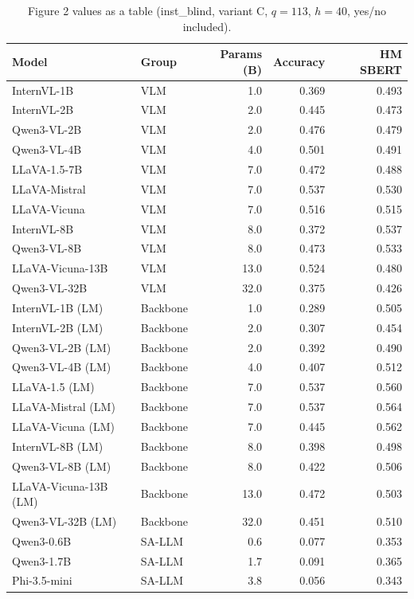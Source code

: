 \begin{table}[t]
\centering
\caption{Figure 2 values as a table (inst\_blind, variant C, $q=113$, $h=40$, yes/no included).}
\label{tab:fig2_scale_table}
\scriptsize
\setlength{\tabcolsep}{4pt}
\begin{tabular}{llrrr}
\toprule
Model & Group & Params (B) & Accuracy & HM SBERT \\
\midrule
InternVL-1B & VLM & 1.0 & 0.369 & 0.493 \\
InternVL-2B & VLM & 2.0 & 0.445 & 0.473 \\
Qwen3-VL-2B & VLM & 2.0 & 0.476 & 0.479 \\
Qwen3-VL-4B & VLM & 4.0 & 0.501 & 0.491 \\
LLaVA-1.5-7B & VLM & 7.0 & 0.472 & 0.488 \\
LLaVA-Mistral & VLM & 7.0 & 0.537 & 0.530 \\
LLaVA-Vicuna & VLM & 7.0 & 0.516 & 0.515 \\
InternVL-8B & VLM & 8.0 & 0.372 & 0.537 \\
Qwen3-VL-8B & VLM & 8.0 & 0.473 & 0.533 \\
LLaVA-Vicuna-13B & VLM & 13.0 & 0.524 & 0.480 \\
Qwen3-VL-32B & VLM & 32.0 & 0.375 & 0.426 \\
InternVL-1B (LM) & Backbone & 1.0 & 0.289 & 0.505 \\
InternVL-2B (LM) & Backbone & 2.0 & 0.307 & 0.454 \\
Qwen3-VL-2B (LM) & Backbone & 2.0 & 0.392 & 0.490 \\
Qwen3-VL-4B (LM) & Backbone & 4.0 & 0.407 & 0.512 \\
LLaVA-1.5 (LM) & Backbone & 7.0 & 0.537 & 0.560 \\
LLaVA-Mistral (LM) & Backbone & 7.0 & 0.537 & 0.564 \\
LLaVA-Vicuna (LM) & Backbone & 7.0 & 0.445 & 0.562 \\
InternVL-8B (LM) & Backbone & 8.0 & 0.398 & 0.498 \\
Qwen3-VL-8B (LM) & Backbone & 8.0 & 0.422 & 0.506 \\
LLaVA-Vicuna-13B (LM) & Backbone & 13.0 & 0.472 & 0.503 \\
Qwen3-VL-32B (LM) & Backbone & 32.0 & 0.451 & 0.510 \\
Qwen3-0.6B & SA-LLM & 0.6 & 0.077 & 0.353 \\
Qwen3-1.7B & SA-LLM & 1.7 & 0.091 & 0.365 \\
Phi-3.5-mini & SA-LLM & 3.8 & 0.056 & 0.343 \\

\end{tabular}
\end{table}
